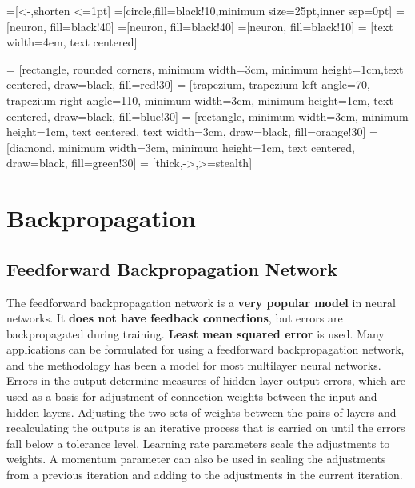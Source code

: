 \documentclass[12pt, right open]{memoir}
\begin{document}
=[<-,shorten <=1pt]
=[circle,fill=black!10,minimum size=25pt,inner sep=0pt]
=[neuron, fill=black!40]
=[neuron, fill=black!40]
=[neuron, fill=black!10]
 = [text width=4em, text centered]

 = [rectangle, rounded corners, minimum width=3cm, minimum height=1cm,text centered, draw=black, fill=red!30]
 = [trapezium, trapezium left angle=70, trapezium right angle=110, minimum width=3cm, minimum height=1cm, text centered, draw=black, fill=blue!30]
 = [rectangle, minimum width=3cm, minimum height=1cm, text centered, text width=3cm, draw=black, fill=orange!30]
 = [diamond, minimum width=3cm, minimum height=1cm, text centered, draw=black, fill=green!30]
 = [thick,->,>=stealth]


\tableofcontents

\chapter{Backpropagation}

\section{Feedforward Backpropagation Network}
The feedforward backpropagation network is a \textbf{very popular model} in neural
networks. It \textbf{does not have feedback connections}, but errors are
backpropagated during training. \textbf{Least mean squared error} is used. Many
applications can be formulated for using a feedforward backpropagation
network, and the methodology has been a model for most multilayer neural
networks. Errors in the output determine measures of hidden layer output
errors, which are used as a basis for adjustment of connection weights between
the input and hidden layers. Adjusting the two sets of weights between the
pairs of layers and recalculating the outputs is an iterative process that is
carried on until the errors fall below a tolerance level. Learning rate
parameters scale the adjustments to weights. A momentum parameter can also
be used in scaling the adjustments from a previous iteration and adding to the
adjustments in the current iteration.
\end{document}
